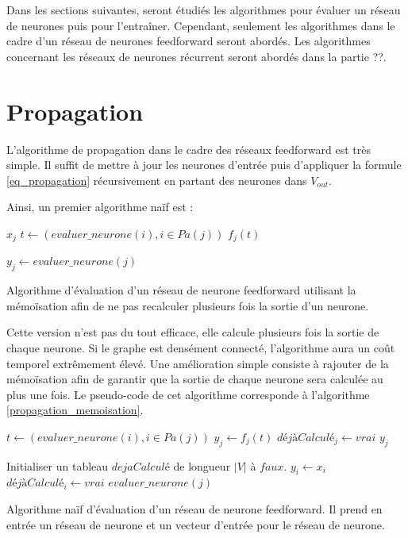 \documentclass{report}
\begin{document}
Dans les sections suivantes, seront étudiés les algorithmes pour évaluer un réseau de neurones puis pour l’entraîner. Cependant, seulement les algorithmes dans le cadre d'un réseau de neurones feedforward seront abordés. Les algorithmes concernant les réseaux de neurones récurrent seront abordés dans la partie ??.

\section{Propagation}

L'algorithme de propagation dans le cadre des réseaux feedforward est très simple. Il suffit de mettre à jour les neurones d'entrée puis d'appliquer la formule \ref{eq_propagation} récursivement en partant des neurones dans $V_{out}$.

Ainsi, un premier algorithme naïf est :

\begin{algorithm} 
\begin{algorithmic}
    	\State \Return $x_j$
	\Else
		\State $t \leftarrow (evaluer\_neurone(i), i \in Pa(j))$
		\State \Return $f_j(t)$
	\EndIf
\EndFunction

	\State $y_j \leftarrow evaluer\_neurone(j)$ 
\EndFor
\EndProcedure
\end{algorithmic} 
\caption{Algorithme d'évaluation d'un réseau de neurone feedforward utilisant la mémoïsation afin de ne pas recalculer plusieurs fois la sortie d'un neurone.}
\end{algorithm}

Cette version n'est pas du tout efficace, elle calcule plusieurs fois la sortie de chaque neurone. Si le graphe est densément connecté, l'algorithme aura un coût temporel extrêmement élevé. Une amélioration simple consiste à rajouter de la mémoïsation afin de garantir que la sortie de chaque neurone sera calculée au plus une fois. Le pseudo-code de cet algorithme corresponde à l'algorithme \ref{propagation_memoisation}.

\begin{algorithm} 
\begin{algorithmic}
		\State $t \leftarrow (evaluer\_neurone(i), i \in Pa(j))$
		\State $y_j \leftarrow f_j(t)$
		\State $déjàCalculé_j \leftarrow vrai$
	\EndIf
	\State \Return $y_j$
\EndFunction

\State Initialiser un tableau $dejaCalculé$ de longueur $|V|$ à $faux$.
	\State $y_i \leftarrow x_i$
	\State $déjàCalculé_i \leftarrow vrai$ 
\EndFor
{}
	\State $evaluer\_neurone(j)$ 
\EndFor
\EndProcedure
\end{algorithmic} 
\caption{Algorithme naïf d'évaluation d'un réseau de neurone feedforward. Il prend en entrée un réseau de neurone et un vecteur d'entrée pour le réseau de neurone.}
\label{propagation_memoisation}
\end{algorithm}
\end{document}
